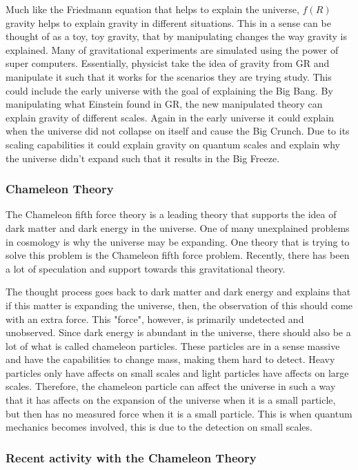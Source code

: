 \documentclass[a4paper]{article}
\begin{document}
Much like the Friedmann equation that helps to explain the universe, $f(R)$ gravity helps to explain gravity in different situations. This in a sense can be thought of as a toy, toy gravity, that by manipulating changes the way gravity is explained. Many of gravitational experiments are simulated using the power of super computers. Essentially, physicist take the idea of gravity from GR and manipulate it such that it works for the scenarios they are trying study. This could include the early universe with the goal of explaining the Big Bang. By manipulating what Einstein found in GR, the new manipulated theory can explain gravity of different scales. Again in the early universe it could explain when the universe did not collapse on itself and cause the Big Crunch. Due to its scaling capabilities it could explain gravity on quantum scales and explain why the universe didn't expand such that it results in the Big Freeze. 

\subsubsection{Chameleon Theory}

The Chameleon fifth force theory is a leading theory that supports the idea of dark matter and dark energy in the universe. One of many unexplained problems in cosmology is why the universe may be expanding. One theory that is trying to solve this problem is the Chameleon fifth force problem. Recently, there has been a lot of speculation and support towards this gravitational theory. 

The thought process goes back to dark matter and dark energy and explains that if this matter is expanding the universe, then, the observation of this should come with an extra force. This "force", however, is primarily undetected and unobserved. Since dark energy is abundant in the universe, there should also be a lot of what is called chameleon particles. These particles are in a sense massive and have the capabilities to change mass, making them hard to detect. Heavy particles only have affects on small scales and light particles have affects on large scales. Therefore,  the chameleon particle can affect the universe in such a way that it has affects on the expansion of the universe when it is a small particle, but then has no measured force when it is a small particle. This is when quantum mechanics becomes involved, this is due to the detection on small scales. 


\subsubsection{Recent activity with the Chameleon Theory}
\end{document}
